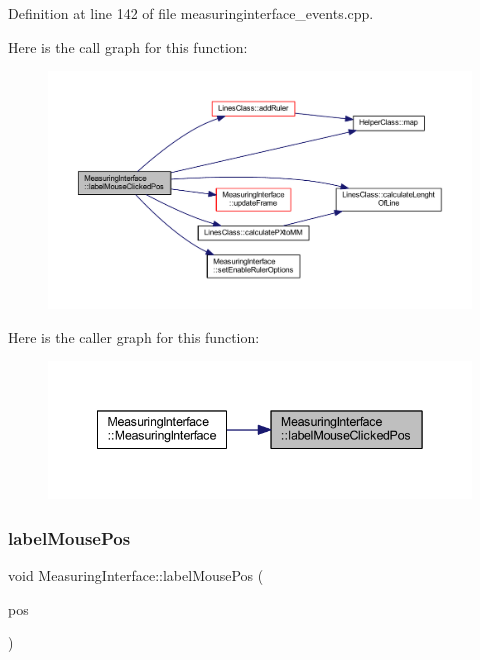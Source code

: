 Definition at line 142 of file measuringinterface\+\_\+events.\+cpp.

Here is the call graph for this function\+:
\nopagebreak
\begin{figure}[H]
\begin{center}
\leavevmode
\includegraphics[width=350pt]{class_measuring_interface_a02eaf8106ec4eb62d0057c6d447f94c5_cgraph}
\end{center}
\end{figure}
Here is the caller graph for this function\+:
\nopagebreak
\begin{figure}[H]
\begin{center}
\leavevmode
\includegraphics[width=342pt]{class_measuring_interface_a02eaf8106ec4eb62d0057c6d447f94c5_icgraph}
\end{center}
\end{figure}
\mbox{\label{class_measuring_interface_a3e7eef22037ecb47ad2349205684c6ea}} 
\subsubsection{\texorpdfstring{labelMousePos}{labelMousePos}}
{\footnotesize\ttfamily void Measuring\+Interface\+::label\+Mouse\+Pos (\begin{DoxyParamCaption}\item[{Q\+Point \&}]{pos }\end{DoxyParamCaption})\hspace{0.3cm}{\ttfamily [slot]}}



